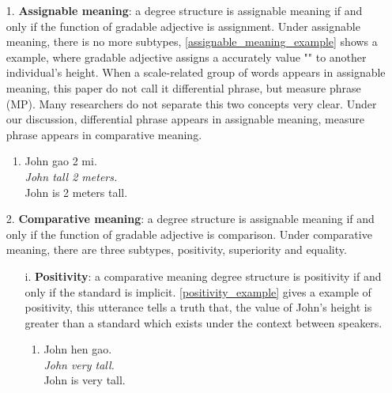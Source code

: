 \documentclass{ctexart}
\begin{document}
\begin{itemize}

    \item[1.] \textbf{Assignable meaning}: a degree structure is assignable meaning if and only if the function of gradable adjective is assignment. Under assignable meaning, there is no more subtypes, \ref{assignable_meaning_example} shows a example, where gradable adjective assigns a accurately value "" to another individual's height. When a scale-related group of words appears in assignable meaning, this paper do not call it differential phrase, but measure phrase (MP). Many researchers do not separate this two concepts very clear. Under our discussion, differential phrase appears in assignable meaning, measure phrase appears in comparative meaning. 
    
    \begin{enumerate}[resume]
        \item \label{assignable_meaning_example}
        John gao 2 mi.\\
        \textit{John tall 2 meters.} \\
        John is 2 meters tall.
    \end{enumerate}
    
    \item[2.] \textbf{Comparative meaning}: a degree structure is assignable meaning if and only if the function of gradable adjective is comparison. Under comparative meaning, there are three subtypes, positivity, superiority and equality. 
    
    \begin{itemize}

        \item[i.] \textbf{Positivity}: a comparative meaning degree structure is positivity if and only if the standard is implicit. \ref{positivity_example} gives a example of positivity, this utterance tells a truth that, the value of John's height is greater than a standard which exists under the context between speakers. 
        
        \begin{enumerate}[resume]
            \item \label{positivity_example}
            John hen gao. \\
            \textit{John very tall.} \\
            John is very tall.
        \end{enumerate}
        

\end{itemize}
\end{itemize}
\end{document}
